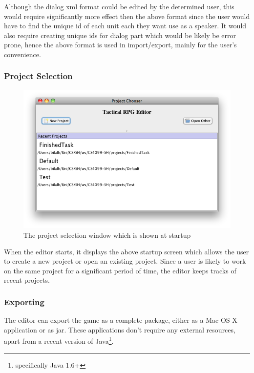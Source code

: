Although the dialog xml format could be edited by the determined user, this would require significantly more effect then the above format since the user would have to find the unique id  of each unit each they want use as a speaker. It would also require creating unique ids for dialog part which would be likely be error prone, hence the above format is used in import/export, mainly for the user's convenience.

\subsubsection{Project Selection}
\begin{figure}[htbp]
	\centering
		\includegraphics[width=1.05\textwidth]{figures/editor/Project_Selection.png}
	\caption{The project selection window which is shown at startup}
	\label{fig:figures_editor_Project_Selection}
\end{figure}

When the editor starts, it displays the above startup screen which allows the user to create a new project or open an existing project.  Since a user is likely to work on the same project for a significant period of time, the editor keeps tracks of recent projects. 

\subsubsection{Exporting}
\label{ssub:exporting}

The editor can export the game as a complete package, either as a Mac OS X application or as jar. These applications don't require any external resources, apart from a recent version of Java\footnote{specifically Java 1.6+}.

